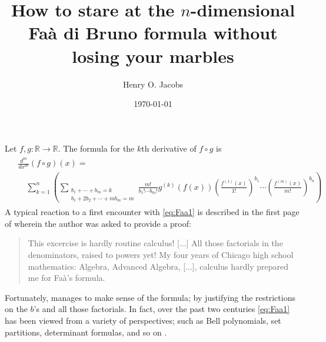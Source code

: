 \documentclass[12pt]{amsart}
\title[Fa\`a di Bruno, without losing your marbles]
{How to stare at the $n$-dimensional Fa\`a di Bruno formula
without losing your marbles}
\author{Henry O. Jacobs}
\date{\today}
\newcommand{\R}{\ensuremath{\mathbb{R}}}
\begin{document}
\maketitle

Let $f,g: \R \to \R$.
The formula for the $k$th derivative of $f\circ g$ is
\begin{align}
  \begin{split}
  &\frac{d^m}{dx^m} (f \circ g)(x) = \\
  &\quad
  \sum_{k=1}^{n}
  \left(
    \sum_{
      \substack{
        b_1 + \cdots + b_m = k \\
        b_1 + 2 b_2 + \cdots + m b_m = m
      }
    }
      \frac{m!}{b_1! \cdots b_m !} g^{(k)}(f(x)) 
      \left( \frac{f^{(1)}(x)}{1!} \right)^{b_1}
      \cdots
      \left( \frac{f^{(m)}(x)}{m!} \right)^{b_n}
  \right)
  \end{split}\label{eq:Faa1}
\end{align}
A typical reaction to a first encounter with \eqref{eq:Faa1}
is described in the first page of \cite{Flanders2001} wherein
the author was asked to provide a proof:

\begin{quotation}
  This excercise is hardly routine calculus!  [...]
  All those factorials in the denominators, raised to powers yet!
  My four years of Chicago high school mathematics: Algebra, Advanced Algebra, [...], calculus hardly prepared me for Fa\`a's formula.
\end{quotation}
Fortunately, \cite{Flanders2001} manages to make sense of the formula; by
justifying the restrictions on the $b$'s and all those factorials.
In fact, over the past two centuries \eqref{eq:Faa1} has been
viewed from a variety of perspectives; such as Bell polynomials, set partitions, determinant formulas, and so on \cite{Johnson2002}.
\end{document}
